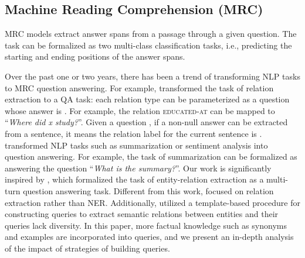 \documentclass[11pt,a4paper]{article}
\begin{document}
\subsection{Machine Reading Comprehension (MRC)}
MRC models  \cite{seo2016bidirectional,wang2016multi,wang2016machine,xiong2016dynamic,xiong2017dcn,wang2016multi,shen2017reasonet,chen2017reading} extract answer spans from a passage through a given question. 
The task can be formalized as two multi-class classification tasks, i.e., predicting the starting and ending positions of the answer spans.

Over the past one or two years, 
there has been a trend of 
 transforming NLP tasks to MRC question answering. For example, \citet{levy2017zero} 
transformed the task of relation extraction to a QA task:
each relation type  can be parameterized as a question  whose answer is . For example, the relation \textsc{educated-at}
can be mapped to  “{\it Where did x study?}”. 
Given a question , 
if a non-null answer  can be extracted from a sentence, it means 
the relation label for the current sentence is . 
 transformed 
 NLP tasks such as summarization or sentiment analysis 
    into question answering. 
For example, the task of summarization can  be formalized as answering the question ``{\it What is the
summary?}''. 
Our work is significantly inspired by , which formalized the task of entity-relation extraction as a multi-turn question answering task.
Different from this work,  focused on relation extraction rather than NER.
Additionally,  
 utilized a template-based procedure for constructing queries to extract semantic relations between entities and their queries lack  diversity. 
In this paper, more factual knowledge such as synonyms and examples are incorporated into queries, and
we  present an in-depth analysis of the impact of strategies of building queries. 
\end{document}
